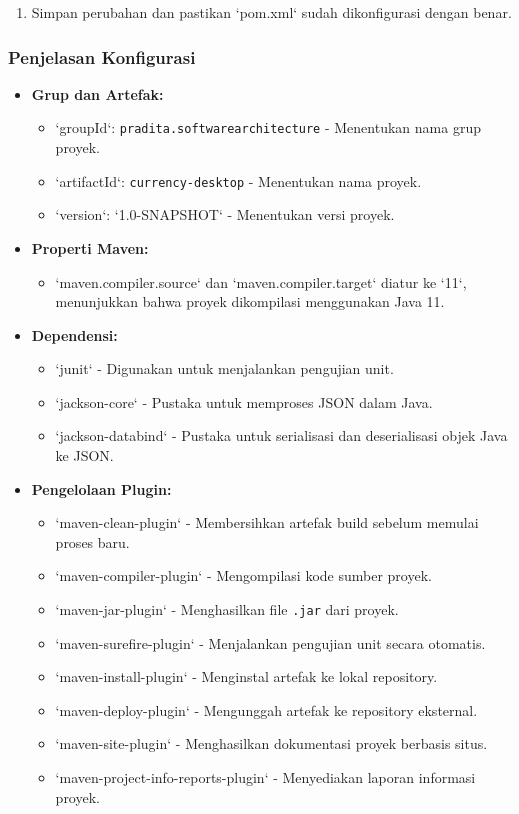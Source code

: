 \begin{enumerate}
\item Simpan perubahan dan pastikan `pom.xml` sudah dikonfigurasi dengan benar.
\end{enumerate}

\subsubsection{Penjelasan Konfigurasi}
\begin{itemize}
\item \textbf{Grup dan Artefak:}  
\begin{itemize}
\item `groupId`: \texttt{pradita.softwarearchitecture} - Menentukan nama grup proyek.
\item `artifactId`: \texttt{currency-desktop} - Menentukan nama proyek.
\item `version`: `1.0-SNAPSHOT` - Menentukan versi proyek.
\end{itemize}
\item \textbf{Properti Maven:}
\begin{itemize}
\item `maven.compiler.source` dan `maven.compiler.target` diatur ke `11`, menunjukkan bahwa proyek dikompilasi menggunakan Java 11.
\end{itemize}
\item \textbf{Dependensi:}
\begin{itemize}
\item `junit` - Digunakan untuk menjalankan pengujian unit.
\item `jackson-core` - Pustaka untuk memproses JSON dalam Java.
\item `jackson-databind` - Pustaka untuk serialisasi dan deserialisasi objek Java ke JSON.
\end{itemize}
\item \textbf{Pengelolaan Plugin:}
\begin{itemize}
\item `maven-clean-plugin` - Membersihkan artefak build sebelum memulai proses baru.
\item `maven-compiler-plugin` - Mengompilasi kode sumber proyek.
\item `maven-jar-plugin` - Menghasilkan file \texttt{.jar} dari proyek.
\item `maven-surefire-plugin` - Menjalankan pengujian unit secara otomatis.
\item `maven-install-plugin` - Menginstal artefak ke lokal repository.
\item `maven-deploy-plugin` - Mengunggah artefak ke repository eksternal.
\item `maven-site-plugin` - Menghasilkan dokumentasi proyek berbasis situs.
\item `maven-project-info-reports-plugin` - Menyediakan laporan informasi proyek.
\end{itemize}
\end{itemize}

